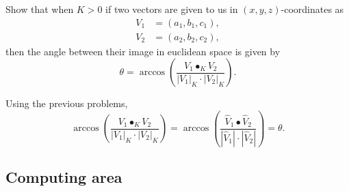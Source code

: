 \documentclass{ximera}
\begin{document}
\begin{problem}
  Show that when $K>0$ if two vectors are given to us in $(x,y,z)$-coordinates as%
\begin{align*}
V_{1}  &=\left(  a_{1},b_{1},c_{1}\right), \\
V_{2}  &=\left(  a_{2},b_{2},c_{2}\right),
\end{align*}
then the angle between their image in euclidean space is given by
\[
\theta = \arccos\left(\frac{V_1\bullet_K V_2}{\left| V_1\right|_K \cdot\left|V_2\right|_K }\right).
\]


\begin{freeResponse} Using the previous problems,
\[
\arccos\left(\frac{V_1\bullet_K V_2}{\left| V_1\right|_K \cdot\left|V_2\right|_K }\right) = \arccos\left(\frac{\hat{V}_{1}\bullet \hat{V}_{2}}{\left| \hat{V}_{1}\right| \cdot\left|\hat{V}_{2}\right| }\right) = \theta.
\]
\end{freeResponse}
\end{problem}




\subsection{Computing area}
\end{document}
